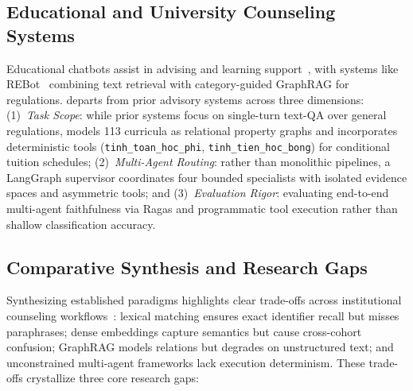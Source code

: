 \subsection{Educational and University Counseling Systems}
\label{sec:educational_counseling}

Educational chatbots assist in advising and learning support~\cite{wollny2021chatbots}, with systems like REBot~\cite{ma2025rebot} combining text retrieval with category-guided GraphRAG for regulations. \system{} departs from prior advisory systems across three dimensions: (1)~\emph{Task Scope}: while prior systems focus on single-turn text-QA over general regulations, \system{} models 113 curricula as relational property graphs and incorporates deterministic tools (\texttt{tinh\_toan\_hoc\_phi}, \texttt{tinh\_tien\_hoc\_bong}) for conditional tuition schedules; (2)~\emph{Multi-Agent Routing}: rather than monolithic pipelines, a LangGraph supervisor coordinates four bounded specialists with isolated evidence spaces and asymmetric tools; and (3)~\emph{Evaluation Rigor}: evaluating end-to-end multi-agent faithfulness via Ragas and programmatic tool execution rather than shallow classification accuracy.

\subsection{Comparative Synthesis and Research Gaps}
\label{sec:gaps}

Synthesizing established paradigms highlights clear trade-offs across institutional counseling workflows~\cite{cormack2009rrf,edge2024graphrag,jeong2024adaptiverag,karpukhin2020dpr,robertson2009bm25,schick2023toolformer,wu2023autogen,yao2023react}: lexical matching ensures exact identifier recall but misses paraphrases; dense embeddings capture semantics but cause cross-cohort confusion; GraphRAG models relations but degrades on unstructured text; and unconstrained multi-agent frameworks lack execution determinism. These trade-offs crystallize three core research gaps:

